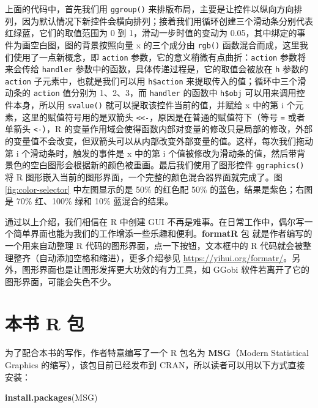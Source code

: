 \documentclass[
  b5paper,
  UTF8,twoside]{book}
\newenvironment{Shaded}{\begin{snugshade}}{\end{snugshade}}
\newcommand{\FunctionTok}[1]{\textcolor[rgb]{0.13,0.29,0.53}{\textbf{#1}}}
\newcommand{\NormalTok}[1]{#1}
\newcommand{\StringTok}[1]{\textcolor[rgb]{0.31,0.60,0.02}{#1}}
\begin{document}
上面的代码中，首先我们用 \texttt{ggroup()} 来排版布局，主要是让控件以纵向方向排列，因为默认情况下新控件会横向排列；接着我们用循环创建三个滑动条分别代表红绿蓝，它们的取值范围为 0 到 1，滑动一步时值的变动为 0.05，其中绑定的事件为画空白图，图的背景按照向量 x 的三个成分由 \texttt{rgb()} 函数混合而成，这里我们使用了一点新概念，即 \texttt{action} 参数，它的意义稍微有点曲折：\texttt{action} 参数将来会传给 \texttt{handler} 参数中的函数，具体传递过程是，它的取值会被放在 \texttt{h} 参数的 \texttt{action} 子元素中，也就是我们可以用 \texttt{h\$action} 来提取传入的值；循环中三个滑动条的 \texttt{action} 值分别为 1、2、3，而 \texttt{handler} 的函数中 \texttt{h\$obj} 可以用来调用控件本身，所以用 \texttt{svalue()} 就可以提取该控件当前的值，并赋给 x 中的第 i 个元素，这里的赋值符号用的是双箭头 \texttt{\textless{}\textless{}-}，原因是在普通的赋值符下（等号 \texttt{=} 或者单箭头 \texttt{\textless{}-}），R 的变量作用域会使得函数内部对变量的修改只是局部的修改，外部的变量值不会改变，但双箭头可以从内部改变外部变量的值。这样，每次我们拖动第 i 个滑动条时，触发的事件是 x 中的第 i 个值被修改为滑动条的值，然后带背景色的空白图形会根据新的颜色被重画。最后我们使用了图形控件 \texttt{ggraphics()} 将 R 图形嵌入当前的图形界面，一个完整的颜色混合器界面就完成了。图 \ref{fig:color-selector} 中左图显示的是 50\% 的红色配 50\% 的蓝色，结果是紫色；右图是 70\% 红、100\% 绿和 10\% 蓝混合的结果。

通过以上介绍，我们相信在 R 中创建 GUI 不再是难事。在日常工作中，偶尔写一个简单界面也能为我们的工作增添一些乐趣和便利。\textbf{formatR} 包 \citep{formatR} 就是作者编写的一个用来自动整理 R 代码的图形界面，点一下按钮，文本框中的 R 代码就会被整理整齐（自动添加空格和缩进），更多介绍参见 \url{https://yihui.org/formatr/}。另外，图形界面也是让图形发挥更大功效的有力工具，如 GGobi 软件若离开了它的图形界面，可能会失色不少。

\chapter{本书 R 包}\label{chap:MSG}

为了配合本书的写作，作者特意编写了一个 R 包名为 \textbf{MSG}（Modern Statistical Graphics 的缩写），该包目前已经发布到 CRAN，所以读者可以用以下方式直接安装：

\begin{Shaded}
\begin{Highlighting}[]
\FunctionTok{install.packages}\NormalTok{(}\StringTok{\textquotesingle{}MSG\textquotesingle{}}\NormalTok{)}
\end{Highlighting}
\end{Shaded}
\end{document}
